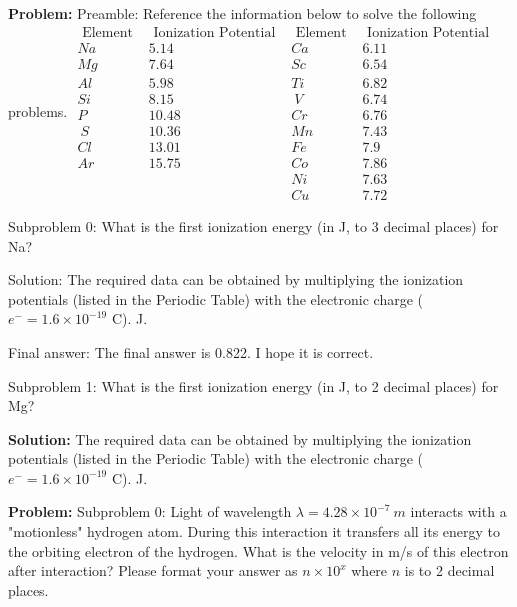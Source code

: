 \documentclass[10pt]{article}
\begin{document}
\textbf{Problem:}
Preamble: Reference the information below to solve the following problems. 
$\begin{array}{llll}\text { Element } & \text { Ionization Potential }  & \text { Element } & \text { Ionization Potential } \\ {Na} & 5.14 & {Ca} & 6.11 \\ {Mg} & 7.64 & {Sc} & 6.54 \\ {Al} & 5.98 & {Ti} & 6.82 \\ {Si} & 8.15 & {~V} & 6.74 \\ {P} & 10.48 & {Cr} & 6.76 \\ {~S} & 10.36 & {Mn} & 7.43 \\ {Cl} & 13.01 & {Fe} & 7.9 \\ {Ar} & 15.75 & {Co} & 7.86 \\ & & {Ni} & 7.63 \\ & & {Cu} & 7.72\end{array}$

Subproblem 0: What is the first ionization energy (in J, to 3 decimal places) for Na?


Solution: The required data can be obtained by multiplying the ionization potentials (listed in the Periodic Table) with the electronic charge ( ${e}^{-}=1.6 \times 10^{-19}$ C).
 J.

Final answer: The final answer is 0.822. I hope it is correct.

Subproblem 1: What is the first ionization energy (in J, to 2 decimal places) for Mg?


\textbf{Solution:}
The required data can be obtained by multiplying the ionization potentials (listed in the Periodic Table) with the electronic charge ( ${e}^{-}=1.6 \times 10^{-19}$ C).
 J.


\textbf{Problem:}
Subproblem 0: Light of wavelength $\lambda=4.28 \times 10^{-7} {~m}$ interacts with a "motionless" hydrogen atom. During this interaction it transfers all its energy to the orbiting electron of the hydrogen. What is the velocity in m/s of this electron after interaction? Please format your answer as $n \times 10^x$ where $n$ is to 2 decimal places.
\end{document}
